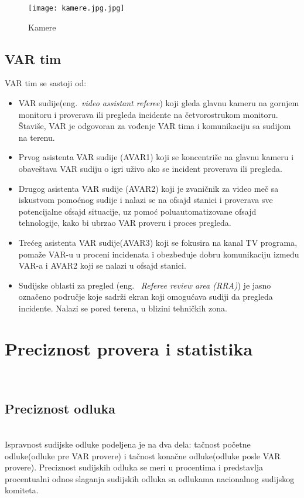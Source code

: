 \documentclass[a4paper]{article}
\begin{document}
\begin{figure}[h!]
\begin{center}
\texttt{[image: kamere.jpg.jpg]}
\end{center}
\caption{Kamere}
\label{kamere.jpg.jpg}
\end{figure}
\subsection{VAR tim}
VAR tim se sastoji od: 
\begin{itemize}
\item VAR sudije(eng.~{\em video assistant referee}) koji gleda glavnu kameru na gornjem monitoru i proverava ili pregleda incidente na četvorostrukom monitoru. Štaviše, VAR je odgovoran za vođenje VAR tima i komunikaciju sa sudijom na terenu.
\item Prvog asistenta VAR sudije (AVAR1) koji se koncentriše na glavnu kameru i obaveštava VAR sudiju o igri uživo ako se incident proverava ili pregleda.
\item Drugog asistenta VAR sudije (AVAR2) koji je zvaničnik za video meč sa iskustvom pomoćnog sudije i nalazi se na ofsajd stanici i proverava sve potencijalne ofsajd situacije, uz pomoć poluautomatizovane ofsajd tehnologije, kako bi ubrzao VAR proveru i proces pregleda.
\item Trećeg asistenta VAR sudije(AVAR3) koji se fokusira na kanal TV programa, pomaže VAR-u u proceni incidenata i obezbeđuje dobru komunikaciju između VAR-a i AVAR2 koji se nalazi u ofsajd stanici.
\item Sudijske oblasti za pregled (eng. ~{\em Referee review area (RRA)}) je jasno označeno područje koje sadrži ekran koji omogućava sudiji da pregleda incidente. Nalazi se pored terena, u blizini tehničkih zona.
\end{itemize}

\section{Preciznost provera i statistika} \\

\subsection{Preciznost odluka} \\

Ispravnost sudijske odluke podeljena je na dva dela: tačnost početne odluke(odluke pre VAR provere) i tačnost konačne odluke(odluke posle VAR provere). Preciznost sudijskih odluka se meri u procentima i predstavlja procentualni odnos slaganja sudijskih odluka sa odlukama nacionalnog sudijskog komiteta. \\
\end{document}
